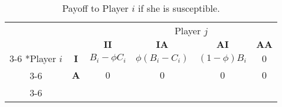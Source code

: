 \documentclass{article}
\theoremstyle{definition}
\theoremstyle{exercise}
\theoremstyle{remark}
\begin{document}
  \begin{table}[H]
      \centering
    \setlength{\extrarowheight}{2pt}
    \begin{tabular}{cc|c|c|c|c|}
        & \multicolumn{1}{c}{} & \multicolumn{1}{c}{} & \multicolumn{2}{c}{Player $j$} & \multicolumn{1}{c}{}\\
        & \multicolumn{1}{c}{} & \multicolumn{1}{c}{$\bm{II}$}  & \multicolumn{1}{c}{$\bm{IA}$} & \multicolumn{1}{c}{$\bm{AI}$}& \multicolumn{1}{c}{$\bm{A A}$}\\\cline{3-6}
        \multirow{2}*{Player $i$}  & $\bm{I}$ & $B_i - \phi C_i$ & $\phi(B_i - C_i)$ & $(1 - \phi) B_i$ & 0 \\\cline{3-6}
        & $\bm{A}$ & $0$ & $0$ & $0$& $0$\\\cline{3-6}
    \end{tabular}
    \caption{Payoff to Player $i$ if she is susceptible.}
  \end{table}
\end{document}
